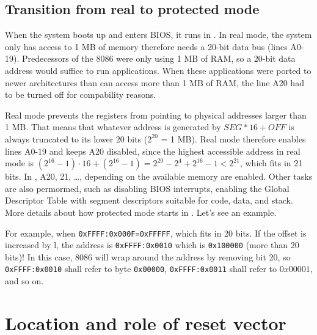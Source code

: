 \documentclass[a4paper]{article}
\begin{document}
\newpage
\subsection{Transition from real to protected mode}

When the system boots up and enters BIOS, it runs in . In real mode, the system only has access to 1 MB of memory therefore needs a 20-bit data bus (lines A0-19). Predecessors of the 8086 were only using 1 MB of RAM, so a 20-bit data address would suffice to run applications. When these applications were ported to newer architectures than can access more than 1 MB of RAM, the line A20 had to be turned off for compability reasons.

Real mode prevents the registers from pointing to physical addresses larger than 1 MB. That means that whatever address is generated by $SEG*16+OFF$ is always truncated to its lower 20 bits ($2^{20}$ = 1 MB). Real mode therefore enables lines A0-19 and keeps A20 disabled, since the highest accessible address in real mode is $(2^{16}-1)\cdot 16+(2^{16}-1) = 2^{20} - 2^4 + 2^{16} - 1 < 2^{21} $, which fits in 21 bits. In , A20, 21, \ldots, depending on the available memory are enabled. Other tasks are also permormed, such as disabling BIOS interrupts, enabling the Global Descriptor Table with segment descriptors suitable for code, data, and stack. More details about how protected mode starts in \TODO[ref]. Let's see an example.

For example, when \texttt{0xFFFF:0x000F=0xFFFFF}, which fits in 20 bits. If the offset is increased by l, the address is \texttt{0xFFFF:0x0010} which is \texttt{0x100000} (more than 20 bits)! In this case, 8086 will wrap around the address by removing bit 20, so \texttt{0xFFFF:0x0010} shall refer to byte \texttt{0x00000}, \texttt{0xFFFF:0x0011} shall refer to $0x00001$, and so on.


\newpage
\section{Location and role of reset vector}
\end{document}
